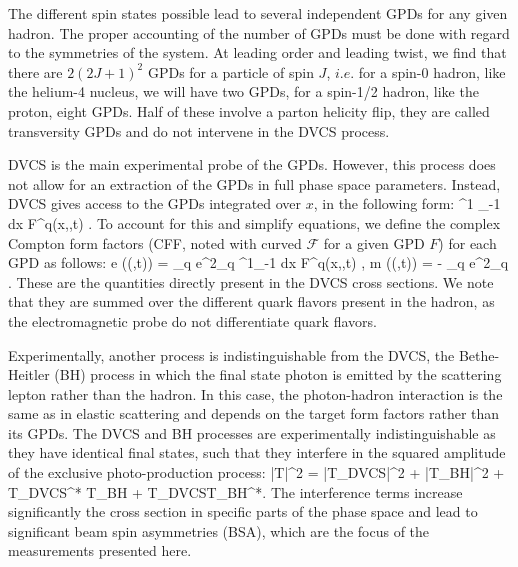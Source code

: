 \documentclass{article}
\let\oldequation\equation
\let\oldendequation\endequation
\renewenvironment{equation}
  {\linenomathNonumbers\oldequation}
  {\oldendequation\endlinenomath}
\begin{document}
The different spin states possible lead to several independent GPDs for any 
given hadron. The proper accounting of the number of GPDs must be done with 
regard to the symmetries of the system. At leading order and leading twist, we 
find that there are $2(2J+1)^2$ GPDs for a particle of spin $J$, 
$i.e.$ for a spin-0 hadron, like the helium-4 nucleus, we will have two GPDs, 
for a spin-1/2 hadron, like the proton, eight GPDs. Half of these involve a 
parton helicity flip, they are called transversity GPDs and do not intervene 
in the DVCS process. 

DVCS is the main experimental probe of the GPDs. However, this process does not allow
for an extraction of the GPDs in full phase space parameters. Instead, DVCS gives access
to the GPDs integrated over $x$, in the following form:
\begin{equation}
	\int^1 _{-1} dx F^{q}(x,\xi,t) . 
\end{equation}
To account for this and simplify equations, we define the complex Compton form factors (CFF,
noted with curved $\mathcal{F}$ for a given GPD $F$) for each GPD as follows:
\begin{equation}
\Re e ((\xi,t)) = \sum _q e^2_q  \int^1_{-1} dx F^{q}(x,\xi,t)
    , 
\end{equation}
\begin{equation}
\Im m ((\xi,t)) = - \pi \sum _q e^2_q \left [ F^{q}(\xi,\xi,t) \mp F^{q}(-\xi,\xi,t) \right]. 
\end{equation} 
These are the quantities directly present in the DVCS cross sections. We note that they are summed over
the different quark flavors present in the hadron, as the electromagnetic probe do not differentiate
quark flavors.

Experimentally, another process is indistinguishable from the DVCS, the Bethe-Heitler (BH) 
process in which 
the final state photon is emitted by the scattering lepton rather than the hadron. In this case, the 
photon-hadron interaction is the same as in elastic scattering and depends on the
target form factors rather than its GPDs. The DVCS and BH processes are experimentally 
indistinguishable as they
have identical final states, such that they interfere in the squared amplitude of the
exclusive photo-production process:
\begin{equation}
|T|^2 = |T_{DVCS}|^2 + |T_{BH}|^2 + T_{DVCS}^* T_{BH} + T_{DVCS}T_{BH}^*. 
\end{equation}
The interference terms increase significantly the cross section in specific parts of the phase space
and lead to significant beam spin asymmetries (BSA), which are the focus of the measurements presented 
here. 
\end{document}
